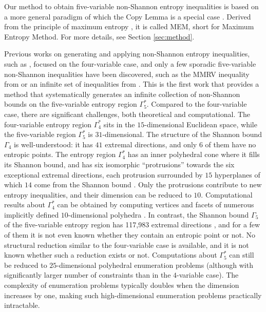 \documentclass[reqno]{amsart}
\theoremstyle{definition}
\def\G#1{\Gamma_{\!#1}}
\def\Ga#1{\Gamma^*_{\!#1}}
\begin{document}
Our method to obtain five-variable non-Shannon entropy inequalities is based
on a more general paradigm of which the Copy Lemma is a special case
\cite{exploring}. Derived from the principle of maximum entropy
\cite{maxentp}, it is called MEM, short for Maximum Entropy Method. For more
details, see Section \ref{sec:method}.

Previous works on generating and applying non-Shannon entropy inequalities,
such as \cite{Beimel.Orlov,csirmaz.book,inner,DFZ11,entreg,studeny}, focused
on the four-variable case, and only a few sporadic five-variable non-Shannon
inequalities have been discovered, such as the MMRV inequality from
\cite{MMRV} or an infinite set of inequalities from \cite{M.infinf}. This is
the first work that provides a method that systematically generates an
infinite collection of non-Shannon bounds on the five-variable entropy
region $\Ga5$. Compared to the four-variable case, there are significant
challenges, both theoretical and computational. The four-variable entropy
region $\Ga4$ sits in the $15$-dimensional Euclidean space, while the
five-variable region $\Ga5$ is $31$-dimensional. The structure of the
Shannon bound $\G4$ is well-understood: it has $41$ extremal directions, and
only $6$ of them have no entropic points. The entropy region $\Ga4$ has an
inner polyhedral cone where it fills its Shannon bound, and has six
isomorphic ``protrusions'' towards the six exceptional extremal directions,
each protrusion surrounded by $15$ hyperplanes of which $14$ come from the
Shannon bound \cite{Ma.Stud}. Only the protrusions contribute to new entropy
inequalities, and their dimension can be reduced to $10$. Computational
results about $\Ga4$ can be obtained by computing vertices and facets of
numerous implicitly defined $10$-dimensional polyhedra \cite{inner}. In
contrast, the Shannon bound $\G5$ of the five-variable entropy region has
117,983 extremal directions \cite{studeny-kocka}, and for a few of them it
is not even known whether they contain an entropic point or not. No
structural reduction similar to the four-variable case is available, and it
is not known whether such a reduction exists or not. Computations about
$\Ga5$ can still be reduced to $25$-dimensional polyhedral enumeration
problems (although with significantly larger number of constraints than in
the $4$-variable case). The complexity of enumeration problems typically
doubles when the dimension increases by one, making such high-dimensional
enumeration problems practically intractable.
\end{document}
